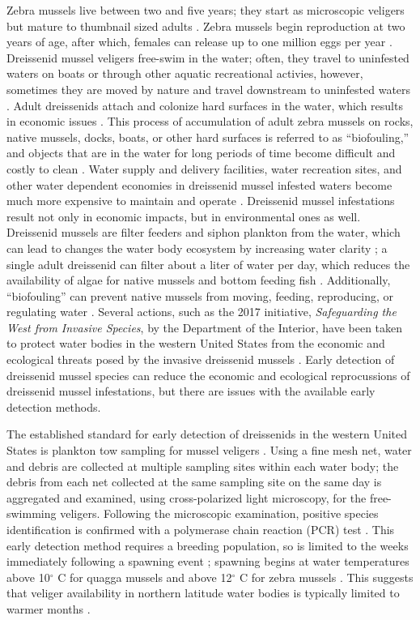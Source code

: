 \documentclass[12pt]{article}\usepackage[]{graphicx}\usepackage[]{color}
\begin{document}
Zebra mussels live between two and five years; they start as microscopic veligers but mature to thumbnail sized adults \cite{NPS}. Zebra mussels begin reproduction at two years of age, after which, females can release up to one million eggs per year \cite{NPS}. Dreissenid mussel veligers free-swim in the water; often, they travel to uninfested waters on boats or through other aquatic recreational activies, however, sometimes they are moved by nature and travel downstream to uninfested waters \cite{BOR, Holser:body, NPS}. Adult dreissenids attach and colonize hard surfaces in the water, which results in economic issues \cite{Holser:detection}. This process of accumulation of adult zebra mussels on rocks, native mussels, docks, boats, or other hard surfaces is referred to as ``biofouling,'' and objects that are in the water for long periods of time become difficult and costly to clean \cite{NPS}. Water supply and delivery facilities, water recreation sites, and other water dependent economies in dreissenid mussel infested waters become much more expensive to maintain and operate \cite{BOR}. Dreissenid mussel infestations result not only in economic impacts, but in environmental ones as well. Dreissenid mussels are filter feeders and siphon plankton from the water, which can lead to changes the water body ecosystem by increasing water clarity \cite{NPS}; a single adult dreissenid can filter about a liter of water per day, which reduces the availability of algae for native mussels and bottom feeding fish \cite{BOR}. Additionally, ``biofouling'' can prevent native mussels from moving, feeding, reproducing, or regulating water \cite{NPS}. Several actions, such as the 2017 initiative, \textit{Safeguarding the West from Invasive Species}, by the Department of the Interior, have been taken to protect water bodies in the western United States from the economic and ecological threats posed by the invasive dreissenid mussels \cite{BOR}. Early detection of dreissenid mussel species can reduce the economic and ecological reprocussions of dreissenid mussel infestations, but there are issues with the available early detection methods. 

The established standard for early detection of dreissenids in the western United States is plankton tow sampling for mussel veligers \cite{Sepulveda:eDNA}. Using a fine mesh net, water and debris are collected at multiple sampling sites within each water body; the debris from each net collected at the same sampling site on the same day is aggregated and examined, using cross-polarized light microscopy, for the free-swimming veligers. Following the microscopic examination, positive species identification is confirmed with a polymerase chain reaction (PCR) test \cite{Sepulveda:eDNA}. This early detection method requires a breeding population, so is limited to the weeks immediately following a spawning event \cite{Nichols}; spawning begins at water temperatures above 10$^\circ$ C for quagga mussels and above 12$^\circ$ C for zebra mussels \cite{McMahon, Mills}. This suggests that 
veliger availability in northern latitude water bodies is typically limited to warmer months \cite{Sepulveda:eDNA}.
\end{document}
